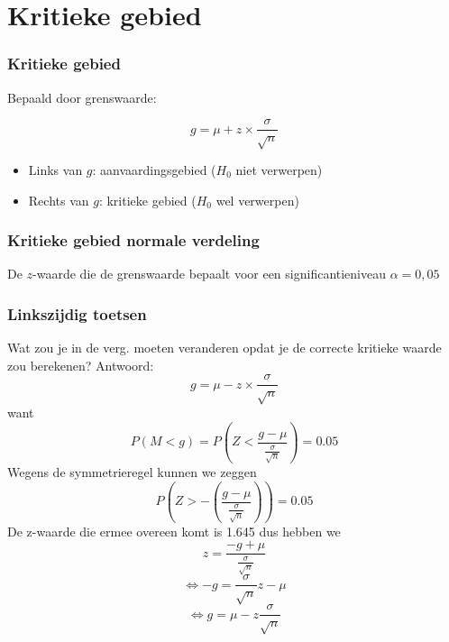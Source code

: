 \documentclass{beamer}
\begin{document}
\section{Kritieke gebied}
\sectionframelogo{}

\begin{frame}
  \frametitle{Kritieke gebied}
  
  
  Bepaald door grenswaarde:
  
  \[g = \mu + z \times \frac{\sigma}{\sqrt{n}} \]
  
  \begin{itemize}
    \item Links van $g$: aanvaardingsgebied ($H_0$ niet verwerpen)
    \item Rechts van $g$: kritieke gebied ($H_0$ wel verwerpen)
  \end{itemize}
  
\end{frame}


\begin{frame}
  \frametitle{Kritieke gebied normale verdeling}

  \centering
  
  De $z$-waarde die de grenswaarde bepaalt voor een significantieniveau $\alpha = 0,05$
\end{frame}

\begin{frame}
  \frametitle{Linkszijdig toetsen}
    Wat zou je in de verg.  moeten veranderen opdat je de correcte kritieke waarde zou berekenen?
    \pause
    Antwoord:
 \[g = \mu - z \times \frac{\sigma}{\sqrt{n}} \]
want
\[ P(M < g) = P\left(Z < \frac{g - \mu}{\frac{\sigma}{\sqrt{n}}}\right) = 0.05 \]
Wegens de symmetrieregel kunnen we zeggen
\[ P\left(Z > - \left( \frac{g - \mu}{\frac{\sigma}{\sqrt{n}}} \right) \right) = 0.05 \]
De z-waarde die ermee overeen komt is 1.645 dus hebben we
\[ z = \frac{-g + \mu}{\frac{\sigma}{\sqrt{n}}} \]
\[ \Leftrightarrow -g = \frac{\sigma}{\sqrt{n}} z - \mu \]
\[ \Leftrightarrow g = \mu - z \frac{\sigma}{\sqrt{n}} \]
\end{frame}
\end{document}
